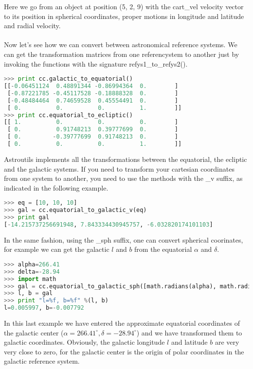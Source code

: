\documentclass[
a4paper, %
11pt, %
onecolumn, %
openany, %
]{memoir}
\begin{document}
Here we go from an object at position (5, 2, 9) with the cart\_vel velocity vector to its position
in spherical coordinates, proper motions in longitude and latitude and radial velocity. \\\\
Now let's see how we can convert between astronomical reference systems. We can get the transformation
matrices from one referencystem to another just by invoking the functions with the signature
refys1\_to\_refys2().

\begin{lstlisting}[language=Python]
>>> print cc.galactic_to_equatorial()
[[-0.06451124  0.48891344 -0.86994364  0.        ]
 [-0.87221785 -0.45117528 -0.18888328  0.        ]
 [-0.48484464  0.74659528  0.45554491  0.        ]
 [ 0.          0.          0.          1.        ]]
>>> print cc.equatorial_to_ecliptic()
[[ 1.          0.          0.          0.        ]
 [ 0.          0.91748213  0.39777699  0.        ]
 [ 0.         -0.39777699  0.91748213  0.        ]
 [ 0.          0.          0.          1.        ]]
\end{lstlisting}

Astroutils implements all the transformations between the equatorial, the ecliptic and the galactic systems.
If you need to transform your cartesian coordinates from one system to another, you need to use the 
methods with the \_v suffix, as indicated in the following example.

\begin{lstlisting}[language=Python]
>>> eq = [10, 10, 10]
>>> gal = cc.equatorial_to_galactic_v(eq)
>>> print gal
[-14.215737256691948, 7.843334430945757, -6.032820174101103]
\end{lstlisting}

In the same fashion, using the \_sph suffix, one can convert spherical coorinates, for example we can get the galactic $l$ and
$b$ from the equatorial $\alpha$ and $\delta$.

\begin{lstlisting}[language=Python]
>>> alpha=266.41
>>> delta=-28.94
>>> import math
>>> gal = cc.equatorial_to_galactic_sph([math.radians(alpha), math.radians(delta)])
>>> l, b = gal
>>> print "l=%f, b=%f" %(l, b)
l=0.005997, b=-0.007792
\end{lstlisting}

In this last example we have entered the approximate equatorial coordinates of the galactic center ($\alpha=266.41^{\circ}, \delta=-28.94^{\circ}$)
and we have transformed them to galactic coordinates. Obviously, the galactic longitude $l$ and latitude $b$ are very very close to zero, for the
galactic center is the origin of polar coordinates in the galactic reference system.
\end{document}
